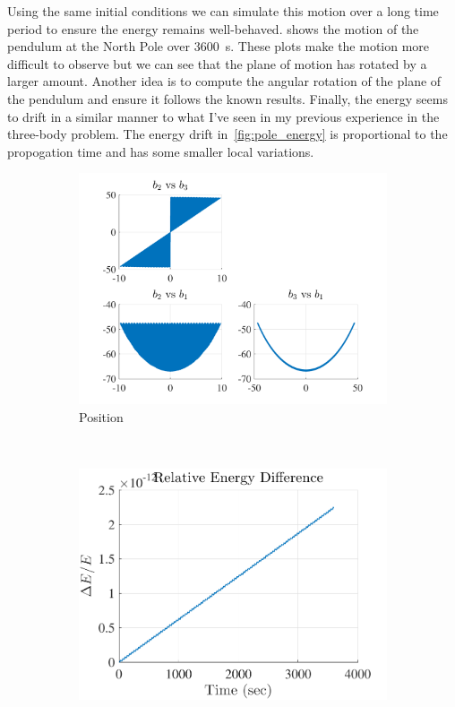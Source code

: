 \documentclass[11pt, reqno]{article}   	%
\begin{document}
Using the same initial conditions we can simulate this motion over a long time period to ensure the energy remains well-behaved.
 shows the motion of the pendulum at the North Pole over \SI{3600}{s}.
These plots make the motion more difficult to observe but we can see that the plane of motion has rotated by a larger amount.
Another idea is to compute the angular rotation of the plane of the pendulum and ensure it follows the known results.
Finally, the energy seems to drift in a similar manner to what I've seen in my previous experience in the three-body problem.
The energy drift in~\cref{fig:pole_energy} is proportional to the propogation time and has some smaller local variations.
\begin{figure}[htbp] 
    \centering 
    \begin{subfigure}[htbp]{0.5\textwidth} 
        \includegraphics[width=\textwidth]{figures/pole_position.pdf} 
        \caption{Position } \label{fig:pole_pos} 
    \end{subfigure}~ %
    \begin{subfigure}[htbp]{0.5\textwidth} 
        \includegraphics[width=\textwidth]{figures/pole_energy.pdf} 

\end{subfigure}
\end{figure}
\end{document}
